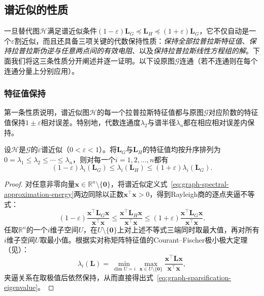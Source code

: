 \subsection{谱近似的性质}
\label{sec:graph-spectral-approximation-consequences}

一旦替代图$\mathcal H$满足谱近似条件$(1-\varepsilon)\bm L_G\preceq\bm L_H\preceq(1+\varepsilon)\bm L_G$，它不仅自动是一个$\varepsilon$割近似，而且还具备三项关键的代数保持性质：\emph{保持全部拉普拉斯特征值}、\emph{保持拉普拉斯伪逆与任意两点间的有效电阻}、以及\emph{保持拉普拉斯线性方程组的解}。下面我们将这三条性质分开阐述并逐一证明。以下设原图$\mathcal G$连通（若不连通则在每个连通分量上分别应用）。

\subsubsection{特征值保持}
\label{sec:graph-sparsification-eigenvalue-preservation}

第一条性质说明，谱近似图$\mathcal H$的每一个拉普拉斯特征值都与原图$\mathcal G$对应阶数的特征值保持$1\pm\varepsilon$相对误差。特别地，代数连通度$\lambda_2$与谱半径$\lambda_n$都在相应相对误差内保持。

\begin{theorem}[谱近似保持拉普拉斯特征值]
\label{thm:graph-spectral-approximation-consequences}
设$\mathcal H$是$\mathcal G$的$\varepsilon$谱近似（$0<\varepsilon<1$）。将$\bm L_G$与$\bm L_H$的特征值均按升序排列为$0=\lambda_1\leq\lambda_2\leq\cdots\leq\lambda_n$，则对每一个$i=1,2,\ldots,n$都有
\begin{equation}
(1-\varepsilon)\lambda_i(\bm L_G)
\leq \lambda_i(\bm L_H)
\leq (1+\varepsilon)\lambda_i(\bm L_G).
\label{eq:graph-sparsification-eigenvalue}
\end{equation}
\end{theorem}

\begin{proof}
对任意非零向量$\bm x\in\mathbb R^n\setminus\{\bm 0\}$，将谱近似定义式~\eqref{eq:graph-spectral-approximation-energy}两边同除以正数$\bm x^\top\bm x>0$，得到Rayleigh商的逐点夹逼不等式：
\[
  (1-\varepsilon)\frac{\bm x^\top\bm L_G\bm x}{\bm x^\top\bm x}
  \leq \frac{\bm x^\top\bm L_H\bm x}{\bm x^\top\bm x}
  \leq (1+\varepsilon)\frac{\bm x^\top\bm L_G\bm x}{\bm x^\top\bm x}.
\]
任取$\mathbb R^n$的一个$i$维子空间$U$，在$U\setminus\{\bm 0\}$上对上述不等式三端同时取最大值，再对所有$i$维子空间$U$取最小值。根据实对称矩阵特征值的Courant--Fischer极小极大定理（见）：
\[
  \lambda_i(\bm L) = \min_{\dim U=i}\max_{\bm x\in U\setminus\{\bm 0\}}\frac{\bm x^\top\bm L\bm x}{\bm x^\top\bm x},
\]
夹逼关系在取极值后依然保持，从而直接得出式~\eqref{eq:graph-sparsification-eigenvalue}。
\end{proof}

